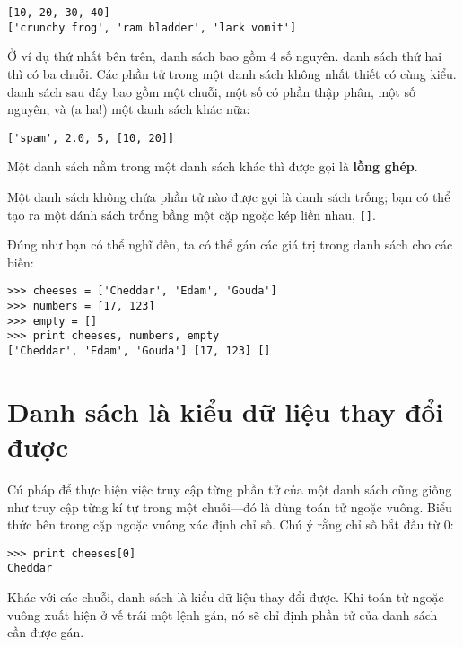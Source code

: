 \documentclass[11pt]{book}
\begin{document}
\beforeverb
\begin{verbatim}
[10, 20, 30, 40]
['crunchy frog', 'ram bladder', 'lark vomit']
\end{verbatim}
\afterverb
%
Ở ví dụ thứ nhất bên trên, danh sách bao gồm 4 số nguyên. danh sách thứ hai thì có
ba chuỗi. Các phần tử trong một danh sách không nhất thiết có cùng kiểu. 
danh sách sau đây bao gồm một chuỗi, một số có phần thập phân, một số nguyên,
và (a ha!) một danh sách khác nữa:

\beforeverb
\begin{verbatim}
['spam', 2.0, 5, [10, 20]]
\end{verbatim}
\afterverb
%
Một danh sách nằm trong một danh sách khác thì được gọi là {\bf lồng ghép}.


Một danh sách không chứa phần tử nào được gọi là danh sách trống; bạn có thể
tạo ra một dánh sách trống bầng một cặp ngoặc kép liền nhau, \verb"[]".


Đúng như bạn có thể nghĩ đến, ta có thể gán các giá trị trong danh sách cho các
biến:

\beforeverb
\begin{verbatim}
>>> cheeses = ['Cheddar', 'Edam', 'Gouda']
>>> numbers = [17, 123]
>>> empty = []
>>> print cheeses, numbers, empty
['Cheddar', 'Edam', 'Gouda'] [17, 123] []
\end{verbatim}
\afterverb
%




\section{Danh sách là kiểu dữ liệu thay đổi được}


Cú pháp để thực hiện việc truy cập từng phần tử của một danh sách
cũng giống như truy cập từng kí tự trong một chuỗi---đó là dùng
toán tử ngoặc vuông. Biểu thức bên trong cặp ngoặc vuông xác định 
chỉ số. Chú ý rằng chỉ số bắt đầu từ 0:

\beforeverb
\begin{verbatim}
>>> print cheeses[0]
Cheddar
\end{verbatim}
\afterverb
%
Khác với các chuỗi, danh sách là kiểu dữ liệu thay đổi được. Khi 
toán tử ngoặc vuông xuất hiện ở vế trái một lệnh gán, nó sẽ chỉ
định phần tử của danh sách cần được gán.
\end{document}
